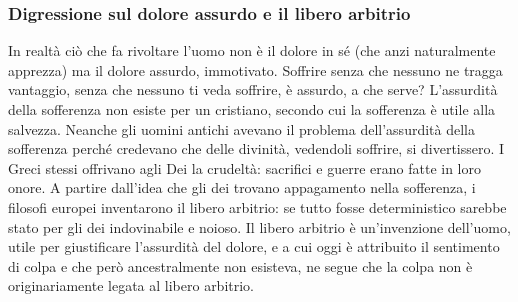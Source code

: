 \documentclass[10pt,a4paper]{article}
\begin{document}
\subsubsection{Digressione sul dolore assurdo e il libero arbitrio}
In realtà ciò che fa rivoltare l'uomo non è il dolore in sé (che anzi naturalmente apprezza) ma il dolore assurdo, immotivato. Soffrire senza che nessuno ne tragga vantaggio, senza che nessuno ti veda soffrire, è assurdo, a che serve? L'assurdità della sofferenza non esiste per un cristiano, secondo cui la sofferenza è utile alla salvezza. Neanche gli uomini antichi avevano il problema dell'assurdità della sofferenza perché credevano che delle divinità, vedendoli soffrire, si divertissero. I Greci stessi offrivano agli Dei la crudeltà: sacrifici e guerre erano fatte in loro onore. A partire dall'idea che gli dei trovano appagamento nella sofferenza, i filosofi europei inventarono il libero arbitrio: se tutto fosse deterministico sarebbe stato per gli dei indovinabile e noioso. Il libero arbitrio è un'invenzione dell'uomo, utile per giustificare l'assurdità del dolore, e a cui oggi è attribuito il sentimento di colpa e che però ancestralmente non esisteva, ne segue che la colpa non è originariamente legata al libero arbitrio.
\end{document}
